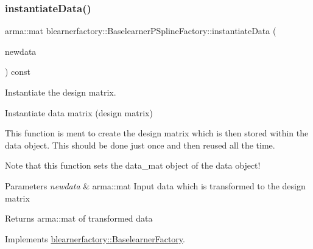 \subsubsection{\texorpdfstring{instantiate\+Data()}{instantiateData()}}
{\footnotesize\ttfamily arma\+::mat blearnerfactory\+::\+Baselearner\+P\+Spline\+Factory\+::instantiate\+Data (\begin{DoxyParamCaption}\item[{const arma\+::mat \&}]{newdata }\end{DoxyParamCaption}) const\hspace{0.3cm}{\ttfamily [virtual]}}



Instantiate the design matrix. 

Instantiate data matrix (design matrix)

This function is ment to create the design matrix which is then stored within the data object. This should be done just once and then reused all the time.

Note that this function sets the {\ttfamily data\+\_\+mat} object of the data object!


\begin{DoxyParams}{Parameters}
{\em newdata} & {\ttfamily arma\+::mat} Input data which is transformed to the design matrix\\
\hline
\end{DoxyParams}
\begin{DoxyReturn}{Returns}
{\ttfamily arma\+::mat} of transformed data 
\end{DoxyReturn}


Implements \hyperlink{classblearnerfactory_1_1_baselearner_factory_a63a1c3853e6170d447feb80b4650c25b}{blearnerfactory\+::\+Baselearner\+Factory}.

